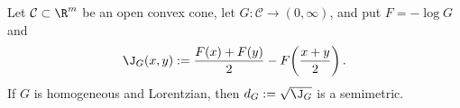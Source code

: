 Let $\mathcal C\subset\R^m$ be an open convex cone, let $G:\mathcal C\to(0,\infty)$, and put $F=-\log G$ and
\[\J_G(x,y):=\frac{F(x)+F(y)}2-F\!\left(\frac{x+y}{2}\right).\]
If $G$ is homogeneous and Lorentzian, then $d_G:=\sqrt{\J_G}$ is a semimetric.
